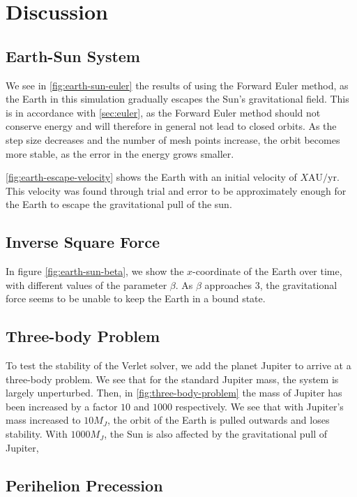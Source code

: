 \documentclass[../main.tex]{subfiles}
\begin{document}
\section{Discussion}\label{sec:discussion}

\subsection{Earth-Sun System}

We see in \cref{fig:earth-sun-euler} the results of using the Forward Euler method, as the Earth in this simulation gradually escapes the Sun's gravitational field. This is in accordance with \cref{sec:euler}, as the Forward Euler method should not conserve energy and will therefore in general not lead to closed orbits. As the step size decreases and the number of mesh points increase, the orbit becomes more stable, as the error in the energy grows smaller.

\cref{fig:earth-escape-velocity} shows the Earth with an initial velocity of $X \text{AU}/\text{yr}$. This velocity was found through trial and error to be approximately enough for the Earth to escape the gravitational pull of the sun. 

\subsection{Inverse Square Force}

In figure \cref{fig:earth-sun-beta}, we show the $x$-coordinate of the Earth over time, with different values of the parameter $\beta$. As $\beta$ approaches $3$, the gravitational force seems to be unable to keep the Earth in a bound state.


\subsection{Three-body Problem}

To test the stability of the Verlet solver, we add the planet Jupiter to arrive at a three-body problem. We see that for the standard Jupiter mass, the system is largely unperturbed. Then, in \cref{fig:three-body-problem} the mass of Jupiter has been increased by a factor $10$ and $1000$ respectively. We see that with Jupiter's mass increased to $10M_J$, the orbit of the Earth is pulled outwards and loses stability. With $1000 M_J$, the Sun is also affected by the gravitational pull of Jupiter, 

\subsection{Perihelion Precession}
\end{document}
